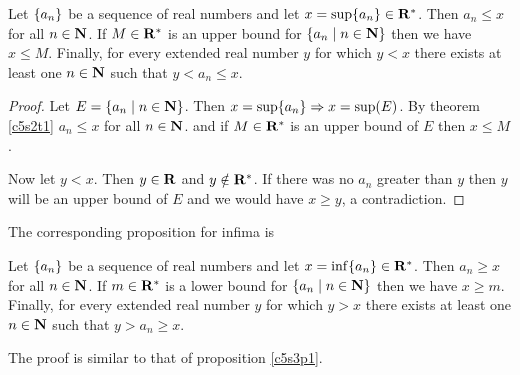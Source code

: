 \begin{prop}\label{c5s3p1}
Let $\{a_n\}$ be a sequence of real numbers and let $x = \sup\{a_n\}
\in \mathbf{R}^\ast$. Then $a_n \le x$ for all $n \in \mathbf{N}$. If $M \in \mathbf{R}^\ast$ is an
upper bound for $\{a_n \;|\; n \in \mathbf{N}\}$ then we have $x \le M$. Finally, 
for every extended
real number $y$ for which $y < x$ there exists at least one $n \in \mathbf{N}$
such that $y < a_n \le x$.
\end{prop}
\begin{proof}
Let $E = \{a_n \;|\; n \in \mathbf{N}\}$. Then $x = \sup\{a_n\} \Rightarrow
x = \sup(E)$. By theorem \ref{c5s2t1} $a_n \le x$ for all $n \in \mathbf{N}$.
and if $M \in \mathbf{R}^\ast$ is an upper bound of $E$ then $x \le M$.

Now let $y < x$. Then $y \in \mathbf{R}$ and $y \notin \mathbf{R}^\ast$. If there was no $a_n$
greater than $y$ then $y$ will be an upper bound of $E$ and we would have $
x \ge y$, a contradiction.
\end{proof}

The corresponding proposition for infima is
\begin{prop}\label{c5s3p2}
Let $\{a_n\}$ be a sequence of real numbers and let $x = \inf\{a_n\}
\in \mathbf{R}^\ast$. Then $a_n \ge x$ for all $n \in \mathbf{N}$. If $m \in \mathbf{R}^\ast$ is a
lower bound for $\{a_n \;|\; n \in \mathbf{N}\}$ then we have $x \ge m$. Finally, 
for every extended real number $y$ for which $y > x$ there exists at least 
one $n \in \mathbf{N}$ such that $y > a_n \ge x$.
\end{prop}
The proof is similar to that of proposition \ref{c5s3p1}.

